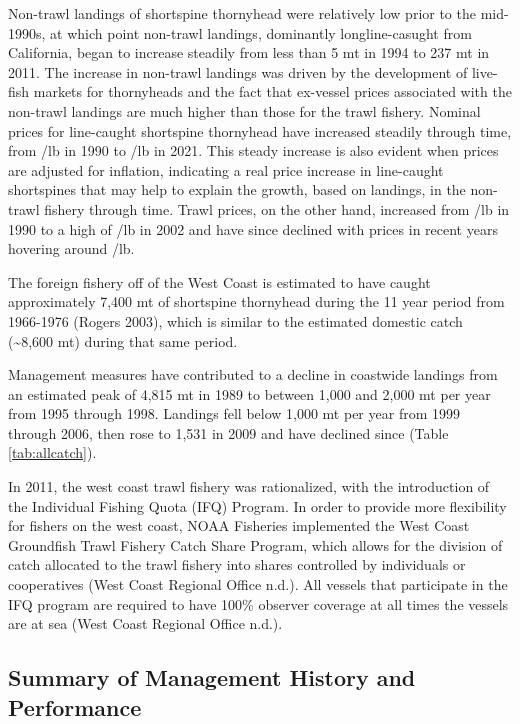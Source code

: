 \documentclass[11pt,
  letterpaper,
]{article}
\begin{document}
Non-trawl landings of shortspine thornyhead were relatively low prior to the mid-1990s, at which point non-trawl landings, dominantly longline-casught from California, began to increase steadily from less than 5 mt in 1994 to 237 mt in 2011. The increase in non-trawl landings was driven by the development of live-fish markets for thornyheads and the fact that ex-vessel prices associated with the non-trawl landings are much higher than those for the trawl fishery. Nominal prices for line-caught shortspine thornyhead have increased steadily through time, from /lb in 1990 to /lb in 2021. This steady increase is also evident when prices are adjusted for inflation, indicating a real price increase in line-caught shortspines that may help to explain the growth, based on landings, in the non-trawl fishery through time. Trawl prices, on the other hand, increased from /lb in 1990 to a high of /lb in 2002 and have since declined with prices in recent years hovering around /lb.

The foreign fishery off of the West Coast is estimated to have caught approximately 7,400 mt of shortspine thornyhead during the 11 year period from 1966-1976 (Rogers 2003), which is similar to the estimated domestic catch (\textasciitilde8,600 mt) during that same period.

Management measures have contributed to a decline in coastwide landings from an estimated peak of 4,815 mt in 1989 to between 1,000 and 2,000 mt per year from 1995 through 1998. Landings fell below 1,000 mt per year from 1999 through 2006, then rose to 1,531 in 2009 and have declined since (Table \ref{tab:allcatch}).

In 2011, the west coast trawl fishery was rationalized, with the introduction of the Individual Fishing Quota (IFQ) Program. In order to provide more flexibility for fishers on the west coast, NOAA Fisheries implemented the West Coast Groundfish Trawl Fishery Catch Share Program, which allows for the division of catch allocated to the trawl fishery into shares controlled by individuals or cooperatives (West Coast Regional Office n.d.). All vessels that participate in the IFQ program are required to have 100\% observer coverage at all times the vessels are at sea (West Coast Regional Office n.d.).

\hypertarget{summary-of-management-history-and-performance}{%
\subsection{Summary of Management History and Performance}\label{summary-of-management-history-and-performance}}
\end{document}
